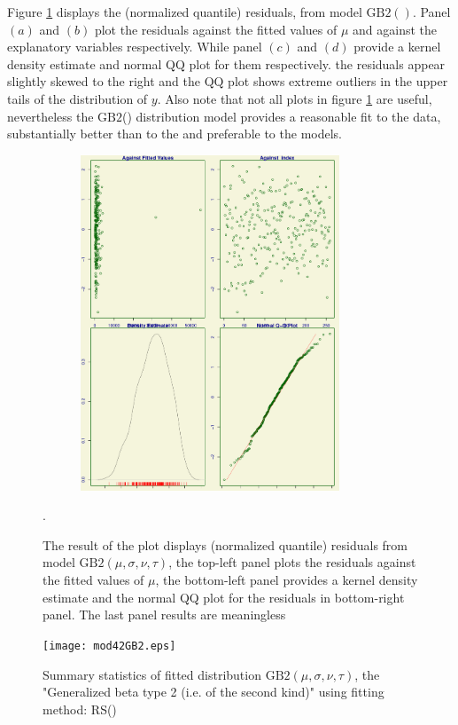 \documentclass{DissertateUSU}
\begin{document}
Figure \ref{4Residual_GOF_plot} displays the (normalized quantile)
residuals, from model \(\mbox{GB}2()\). Panel \((a)\) and \((b)\) plot
the residuals against the fitted values of \(\mu\) and against the
explanatory variables respectively. While panel \((c)\) and \((d)\)
provide a kernel density estimate and normal \(\mbox{QQ}\) plot for them
respectively. the residuals appear slightly skewed to the right and the
\(\mbox{QQ}\) plot shows extreme outliers in the upper tails of the
distribution of \(y\). Also note that not all plots in figure
\ref{4Residual_GOF_plot} are useful, nevertheless the \(\mbox{GB}2\)()
distribution model provides a reasonable fit to the data, substantially
better than to the and preferable to the models.

\begin{figure}
\centering
\includegraphics[height=10cm, width=10cm]{4_GOF_plot.pdf}
\caption[Normalized quantile residuals from model $\mbox{GB}2$]{The result of the plot displays (normalized quantile) residuals from model $\mbox{GB}2(\mu,\sigma,\nu,\tau)$, the top-left panel plots the residuals against the fitted values of $\mu$, the bottom-left panel provides a kernel density estimate and the normal QQ plot for the residuals in bottom-right panel. The last panel results are meaningless}.
\label{4Residual_GOF_plot}
\end{figure}

\singlespacing

\doublespacing

\begin{figure}
\centering
\texttt{[image: mod42GB2.eps]}
\caption[Summary of fitted distribution]{Summary statistics of fitted distribution $\mbox{GB}2(\mu,\sigma,\nu,\tau)$, the "Generalized beta type 2 (i.e. of the second kind)" using fitting method: RS()}
\label{SumGB2Anova}
\end{figure}
\end{document}
